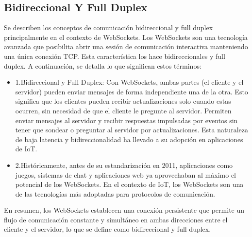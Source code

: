 \documentclass{report}
\begin{document}
\subsection{Bidireccional Y Full Duplex}
Se describen los conceptos de comunicación bidireccional y full duplex principalmente en el contexto de WebSockets.
Los WebSockets son una tecnología avanzada que posibilita abrir una sesión de comunicación interactiva manteniendo una única 
conexión TCP. Esta característica los hace bidireccionales y full duplex.
A continuación, se detalla lo que significan estos términos:
\begin{itemize}
    \item 1.Bidireccional y Full Duplex: Con WebSockets, ambas partes (el cliente y el servidor) pueden enviar mensajes de 
    forma independiente una de la otra. Esto significa que los clientes pueden recibir actualizaciones solo cuando estas ocurren, 
    sin necesidad de que el cliente le pregunte al servidor. Permiten enviar mensajes al servidor y recibir respuestas impulsadas 
    por eventos sin tener que sondear o preguntar al servidor por actualizaciones. Esta naturaleza de baja latencia y 
    bidireccionalidad ha llevado a su adopción en aplicaciones de IoT.
    \item 2.Históricamente, antes de su estandarización en 2011, aplicaciones como juegos, sistemas de chat y aplicaciones web 
    ya aprovechaban al máximo el potencial de los WebSockets. En el contexto de IoT, los WebSockets son una de las tecnologías 
    más adoptadas para protocolos de comunicación.
\end{itemize}
En resumen, los WebSockets establecen una conexión persistente que permite un flujo de comunicación constante y simultáneo en 
ambas direcciones entre el cliente y el servidor, lo que se define como bidireccional y full duplex.
\end{document}
